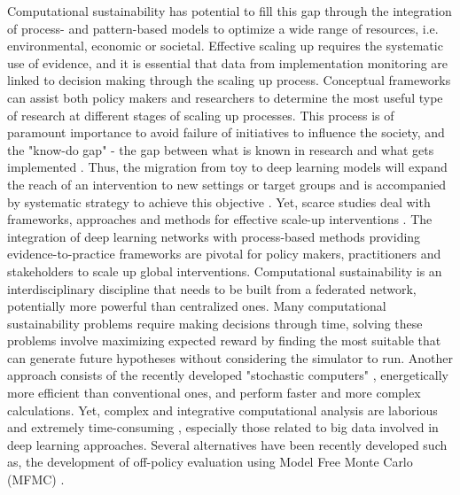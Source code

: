 \documentclass[12pt,a4paper]{article}
\begin{document}
Computational sustainability has potential to fill this gap through the integration of process- and pattern-based models to optimize a wide range of resources, i.e. environmental, economic or societal. Effective scaling up requires the systematic use of evidence, and it is essential that data from implementation monitoring are linked to decision making through the scaling up process. Conceptual frameworks can assist both policy makers and researchers to determine the most useful type of research at different stages of scaling up processes. This process is of paramount importance to avoid failure of initiatives to influence the society, and the "know-do gap" - the gap between what is known in research and what gets implemented \cite{catford2009advancing}. Thus, the migration from toy to deep learning models will expand the reach of an intervention to new settings or target groups and is accompanied by systematic strategy to achieve this objective \cite{milat2014increasing}. Yet, scarce studies deal with frameworks, approaches and methods for effective scale-up interventions \cite{wigboldus2013towards, yamey2012barriers}. The integration of deep learning networks with process-based methods providing evidence-to-practice frameworks are pivotal for policy makers, practitioners and stakeholders to scale up global interventions. Computational sustainability is an interdisciplinary discipline that needs to be built from a federated network, potentially more powerful than centralized ones. Many computational sustainability problems require making decisions through time, solving these problems involve maximizing expected reward by finding the most suitable that can generate future hypotheses without considering the simulator to run. Another approach consists of the recently developed "stochastic computers" \cite{borders2019integer}, energetically more efficient than conventional ones, and perform faster and more complex calculations. Yet, complex and integrative computational analysis are laborious and extremely time-consuming \cite{rodrigues2014integrative}, especially those related to big data involved in deep learning approaches. Several alternatives have been recently developed such as, the development of off-policy evaluation using Model Free Monte Carlo (MFMC) \cite{fontenpoeau2010model}. 

\end{document}
